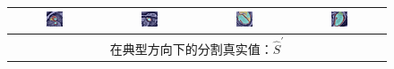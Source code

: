 \begin{figure}
\begin{center}
\begin{tabular}{cccc}
\includegraphics[width=0.19\textwidth]{./data/failures/HCMNet_2000062/00_SAX/9/9_pred.png} &
\includegraphics[width=0.19\textwidth]{./data/failures/HCMNet_2400044/00_SAX/2/5_pred.png} &
\includegraphics[width=0.19\textwidth]{./data/failures/HCMNet_2600079/01_HLA/00/0_pred.png} &
\includegraphics[width=0.19\textwidth]{./data/failures/HCMNet_2600079/02_VLA/00/0_pred.png} \\
\bottomrule

\multicolumn{4}{c}{在典型方向下的分割真实值：$\hat{S}^\prime$} \\


\end{tabular}
\end{center}
\end{figure}
